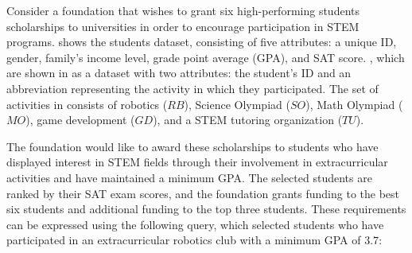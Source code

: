 
\begin{example}
	\label{ex:running}
	Consider a foundation that wishes to grant six high-performing students scholarships to universities in order to encourage participation in STEM programs. 
  shows the students dataset, consisting of five attributes: a unique ID, gender, family's income level, grade point average (GPA), and SAT score. , which are shown in  as a dataset with two attributes: the student's ID and an abbreviation representing the activity in which they participated. The set of activities in  consists of robotics ($RB$), Science Olympiad ($SO$), Math Olympiad ($MO$), game development ($GD$), and a STEM tutoring organization ($TU$).
 
    The foundation would like to award these scholarships to students who have displayed interest in STEM fields through their involvement in extracurricular activities and have maintained a minimum GPA. The selected students are ranked by their SAT exam scores, and the foundation grants funding to the best six students and additional funding to the top three students.
    These requirements can be expressed using the following query, which selected students who have participated in an extracurricular robotics club with a minimum GPA of $3.7$:
    

\end{example}
